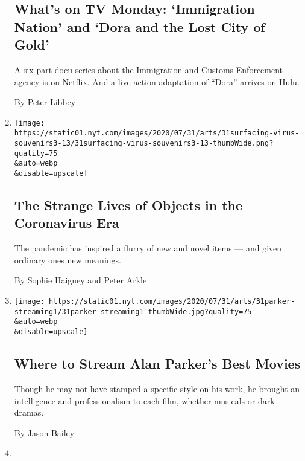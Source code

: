 \begin{enumerate}
  \hypertarget{whats-on-tv-monday-immigration-nation-and-dora-and-the-lost-city-of-gold}{%
  \subsection{What's on TV Monday: `Immigration Nation' and `Dora and
  the Lost City of
  Gold'}\label{whats-on-tv-monday-immigration-nation-and-dora-and-the-lost-city-of-gold}}

  A six-part docu-series about the Immigration and Customs Enforcement
  agency is on Netflix. And a live-action adaptation of ``Dora'' arrives
  on Hulu.

  By Peter Libbey
\item
  \href{/2020/08/01/arts/design/virus-design-objects.html}{}

  \texttt{[image: https://static01.nyt.com/images/2020/07/31/arts/31surfacing-virus-souvenirs3-13/31surfacing-virus-souvenirs3-13-thumbWide.png?quality=75\\\&auto=webp\\\&disable=upscale]}

  \hypertarget{the-strange-lives-of-objects-in-the-coronavirus-era}{%
  \subsection{The Strange Lives of Objects in the Coronavirus
  Era}\label{the-strange-lives-of-objects-in-the-coronavirus-era}}

  The pandemic has inspired a flurry of new and novel items --- and
  given ordinary ones new meanings.

  By Sophie Haigney and Peter Arkle
\item
  \href{/2020/07/31/movies/alan-parker-stream.html}{}

  \texttt{[image: https://static01.nyt.com/images/2020/07/31/arts/31parker-streaming1/31parker-streaming1-thumbWide.jpg?quality=75\\\&auto=webp\\\&disable=upscale]}

  \hypertarget{where-to-stream-alan-parkers-best-movies}{%
  \subsection{Where to Stream Alan Parker's Best
  Movies}\label{where-to-stream-alan-parkers-best-movies}}

  Though he may not have stamped a specific style on his work, he
  brought an intelligence and professionalism to each film, whether
  musicals or dark dramas.

  By Jason Bailey
\item
  \href{/2020/07/31/movies/shakuntala-devi-movie.html}{}


\end{enumerate}
